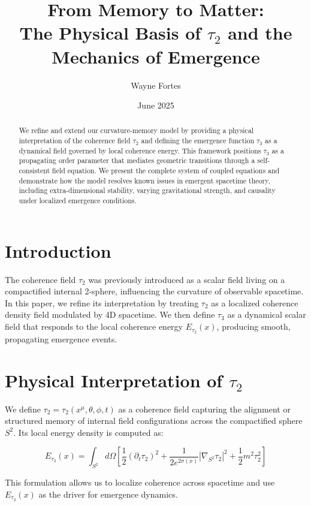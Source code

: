 \documentclass[12pt]{article}
\title{From Memory to Matter:\\The Physical Basis of $\tau_2$ and the Mechanics of Emergence}
\author{Wayne Fortes}
\date{June 2025}
\begin{document}
\maketitle

\begin{abstract}
We refine and extend our curvature-memory model by providing a physical interpretation of the coherence field $\tau_2$ and defining the emergence function $\tau_3$ as a dynamical field governed by local coherence energy. This framework positions $\tau_3$ as a propagating order parameter that mediates geometric transitions through a self-consistent field equation. We present the complete system of coupled equations and demonstrate how the model resolves known issues in emergent spacetime theory, including extra-dimensional stability, varying gravitational strength, and causality under localized emergence conditions.
\end{abstract}

\section{Introduction}

The coherence field $\tau_2$ was previously introduced as a scalar field living on a compactified internal 2-sphere, influencing the curvature of observable spacetime. In this paper, we refine its interpretation by treating $\tau_2$ as a localized coherence density field modulated by 4D spacetime. We then define $\tau_3$ as a dynamical scalar field that responds to the local coherence energy $E_{\tau_2}(x)$, producing smooth, propagating emergence events.

\section{Physical Interpretation of $\tau_2$}

We define $\tau_2 = \tau_2(x^\mu, \theta, \phi, t)$ as a coherence field capturing the alignment or structured memory of internal field configurations across the compactified sphere $S^2$. Its local energy density is computed as:

\[
E_{\tau_2}(x) = \int_{S^2} d\Omega \left[
\frac{1}{2} (\partial_t \tau_2)^2 +
\frac{1}{2e^{2\sigma(x)}} |\nabla_{S^2} \tau_2|^2 +
\frac{1}{2} m^2 \tau_2^2
\right]
\]

This formulation allows us to localize coherence across spacetime and use $E_{\tau_2}(x)$ as the driver for emergence dynamics.
\end{document}
